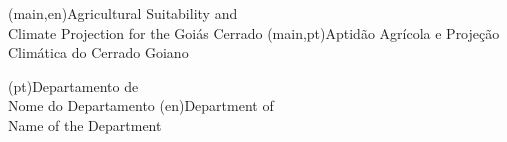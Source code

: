 
%


\nttitle(main,en){Agricultural Suitability and\\Climate Projection for the Goiás Cerrado}%
\nttitle(main,pt){Aptidão Agrícola e Projeção\\Climática do Cerrado Goiano}%



\ntdepartment*(pt){Departamento de\\Nome do Departamento}
\ntdepartment*(en){Department of\\Name of the Department}


